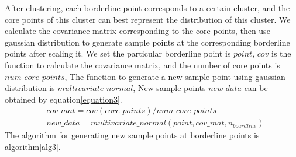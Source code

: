 \documentclass[runningheads]{llncs}
\begin{document}
After clustering, each borderline point corresponds to a certain cluster, 
and the core points of this cluster can best represent the distribution of this cluster.
We calculate the covariance matrix corresponding to the core points, 
then use gaussian distribution to generate sample points at the corresponding borderline points after scaling it.
We set the particular borderline point is $point$, $cov$ is the function to calculate the covariance matrix,
and the number of core points is $num\_core\_points$,
The function to generate a new sample point using gaussian distribution is $multivariate\_normal$,
New sample points $new\_data$ can be obtained by equation\ref{equation3}.
\begin{equation}
  \label{equation3}
  \begin{aligned}
     & cov\_mat=cov(core\_points)/num\_core\_points \\
     & new\_data=multivariate\_normal(point,cov\_mat,n_{boardline})
  \end{aligned}
\end{equation}
The algorithm for generating new sample points at borderline points is algorithm\ref{alg3}.
\end{document}
